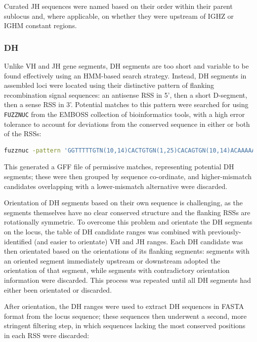 Curated JH sequences were named based on their order within their parent sublocus and, where applicable, on whether they were upstream of IGHZ or IGHM constant regions. 

\subsubsection{DH}

Unlike VH and JH gene segments, DH segments are too short and variable to be found effectively using an HMM-based search strategy. Instead, DH segments in assembled loci were located using their distinctive pattern of flanking recombination signal sequences: an antisense RSS in 5', then a short D-segment, then a sense RSS in 3'. Potential matches to this pattern were searched for using \texttt{FUZZNUC} from the EMBOSS collection of bioinformatics tools, with a high error tolerance to account for deviations from the conserved sequence in either or both of the RSSs:

\begin{lstlisting}[language=bash]
fuzznuc -pattern 'GGTTTTTGTN(10,14)CACTGTGN(1,25)CACAGTGN(10,14)ACAAAAACC' -pmismatch 8 -rformat gff -outfile <output_path> <locus_sequence_path>
\end{lstlisting}

This generated a GFF file of permissive matches, representing potential DH segments; these were then grouped by sequence co-ordinate, and higher-mismatch candidates overlapping with a lower-mismatch alternative were discarded.

Orientation of DH segments based on their own sequence is challenging, as the segments themselves have no clear conserved structure and the flanking RSSs are rotationally symmetric. To overcome this problem and orientate the DH segments on the locus, the table of DH candidate ranges was combined with previously-identified (and easier to orientate) VH and JH ranges. Each DH candidate was then orientated based on the orientations of its flanking segments: segments with an oriented segment immediately upstream or downstream adopted the orientation of that segment, while segments with contradictory orientation information were discarded. This process was repeated until all DH segments had either been orientated or discarded.

After orientation, the DH ranges were used to extract DH sequences in FASTA format from the locus sequence; these sequences then underwent a second, more stringent filtering step, in which sequences lacking the most conserved positions in each RSS were discarded:

